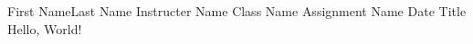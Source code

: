 \documentclass[12pt,letterpaper]{article}
\begin{document}
\begin{mla} %
	{First Name}{Last Name} %
	{Instructer Name} %
	{Class Name} %
	{Assignment Name} %
	{Date} %
	{Title}
Hello, World!
\end{mla}
\end{document}
